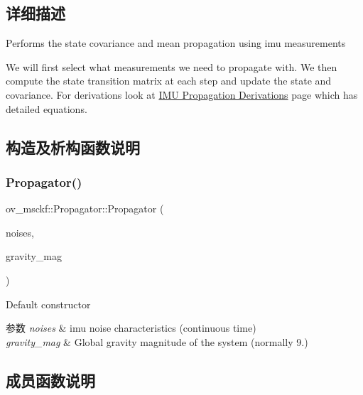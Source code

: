 \subsection{详细描述}
Performs the state covariance and mean propagation using imu measurements 

We will first select what measurements we need to propagate with. We then compute the state transition matrix at each step and update the state and covariance. For derivations look at \hyperlink{propagation}{I\+MU Propagation Derivations} page which has detailed equations. 

\subsection{构造及析构函数说明}
\mbox{\label{classov__msckf_1_1Propagator_a041751e94b04af4134c31a5f32c58d47}} 
\subsubsection{\texorpdfstring{Propagator()}{Propagator()}}
{\footnotesize\ttfamily ov\+\_\+msckf\+::\+Propagator\+::\+Propagator (\begin{DoxyParamCaption}\item[{\hyperlink{structov__msckf_1_1NoiseManager}{Noise\+Manager}}]{noises,  }\item[{double}]{gravity\+\_\+mag }\end{DoxyParamCaption})\hspace{0.3cm}{\ttfamily [inline]}}



Default constructor 


\begin{DoxyParams}{参数}
{\em noises} & imu noise characteristics (continuous time) \\
\hline
{\em gravity\+\_\+mag} & Global gravity magnitude of the system (normally 9.) \\
\hline
\end{DoxyParams}


\subsection{成员函数说明}
\mbox{\label{classov__msckf_1_1Propagator_a33aabf2aea886a848a5ea3f6d83be4a4}} 
